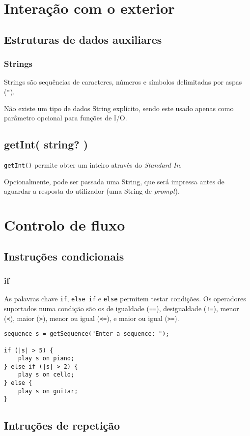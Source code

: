 \documentclass{article}
\begin{document}
\section{Interação com o exterior} \label{exterior}
\subsection{Estruturas de dados auxiliares}
\subsubsection{Strings}
Strings são sequências de caracteres, números e símbolos delimitadas por aspas (\texttt{"}).

Não existe um tipo de dados String explícito, sendo este usado apenas como parâmetro opcional para funções de I/O.
\subsection{getInt( string? )}
\texttt{getInt()} permite obter um inteiro através do \textit{Standard In}. 

Opcionalmente, pode ser passada uma String, que será impressa antes de aguardar a resposta do utilizador (uma String de \textit{prompt}).


\section{Controlo de fluxo} \label{flux}
\subsection{Instruções condicionais}
\subsubsection{if}
As palavras chave \texttt{if}, \texttt{else if} e \texttt{else} permitem testar condições. Os operadores suportados numa condição são os de igualdade (\texttt{==}), desigualdade (\texttt{!=}), menor (\texttt{<}), maior (\texttt{>}), menor ou igual (\texttt{<=}), e maior ou igual (\texttt{>=}).
\begin{lstlisting} 
sequence s = getSequence("Enter a sequence: ");

if (|s| > 5) {
    play s on piano;
} else if (|s| > 2) {
    play s on cello;
} else {
    play s on guitar;
}
\end{lstlisting}

\subsection{Intruções de repetição}
\end{document}
